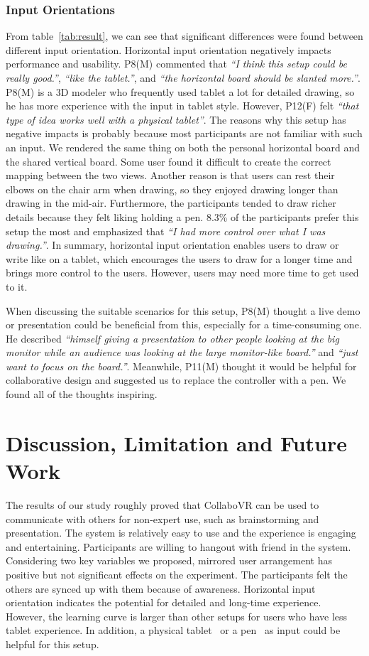 \documentclass{sigchi}
\begin{document}
\subsubsection{Input Orientations}
From table~\ref{tab:result}, we can see that significant differences were found between different input orientation. Horizontal input orientation negatively impacts performance and usability. P8(M) commented that \textit{``I think this setup could be really good.''}, \textit{``like the tablet.''}, and \textit{``the horizontal board should be slanted more.''}. P8(M) is a 3D modeler who frequently used tablet a lot for detailed drawing, so he has more experience with the input in tablet style. However, P12(F) felt \textit{``that type of idea works well with a physical tablet''}. The reasons why this setup has negative impacts is probably because most participants are not familiar with such an input. We rendered the same thing on both the personal horizontal board and the shared vertical board. Some user found it difficult to create the correct mapping between the two views. Another reason is that users can rest their elbows on the chair arm when drawing, so they enjoyed drawing longer than drawing in the mid-air. Furthermore, the participants tended to draw richer details because they felt liking holding a pen. 8.3\% of the participants prefer this setup the most and emphasized that \textit{``I had more control over what I was drawing.''}. In summary, horizontal input orientation enables users to draw or write like on a tablet, which encourages the users to draw for a longer time and brings more control to the users. However, users may need more time to get used to it.

When discussing the suitable scenarios for this setup, P8(M) thought a live demo or presentation could be beneficial from this, especially for a time-consuming one. He described \textit{``himself giving a presentation to other people looking at the big monitor while an audience was looking at the large monitor-like board.''} and \textit{``just want to focus on the board.''}. Meanwhile, P11(M) thought it would be helpful for collaborative design and suggested us to replace the controller with a pen. We found all of the thoughts inspiring.

\section{Discussion, Limitation and Future Work}
The results of our study roughly proved that CollaboVR can be used to communicate with others for non-expert use, such as brainstorming and presentation. The system is relatively easy to use and the experience is engaging and entertaining. Participants are willing to hangout with friend in the system. Considering two key variables we proposed, mirrored user arrangement has positive but not significant effects on the experiment. The participants felt the others are synced up with them because of awareness. Horizontal input orientation indicates the potential for detailed and long-time experience. However, the learning curve is larger than other setups for users who have less tablet experience. In addition, a physical tablet~\cite{sensel} or a pen~\cite{wu2017dodecapen} as input could be helpful for this setup. 
\end{document}
